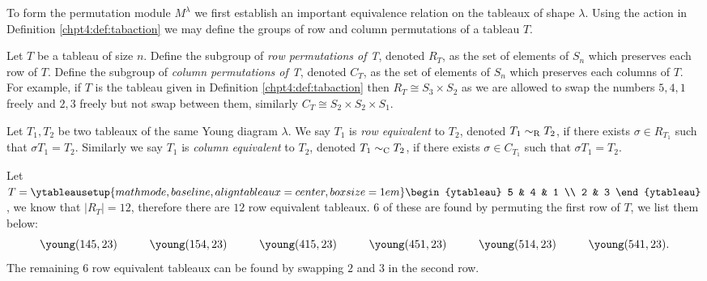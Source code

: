 \documentclass[11pt]{report}
\begin{document}
To form the permutation module $M^{\lambda}$ we first establish an important equivalence relation on the tableaux of shape $\lambda$. Using the action in Definition 
\ref{chpt4:def:tabaction} we may define the groups of row and column 	
permutations of a tableau $T$.
\begin{defn}
	\label{chpt4:def:rowequiv}
	Let $T$ be a tableau of size $n$. Define the subgroup of \emph{row permutations of T}, denoted $R_{T}$, as the set of elements of $S_{n}$ which preserves each row of $T$.  Define the subgroup of \emph{column permutations of T}, denoted $C_{T}$, as the set of elements of $S_{n}$ which preserves each columns of $T$. For example, if 
	$T$ is the tableau given in Definition \ref{chpt4:def:tabaction} then 
	$R_{T} \cong S_{3} \times S_{2}$ as we are 
	allowed to swap the numbers $5,4,1$ freely and $2,3$ freely but not 
	swap between them, similarly $C_{T} \cong S_{2} \times S_{2} \times S_{1}$.
\end{defn}

\begin{defn}
	Let $T_{1}, T_{2}$ be two tableaux of the same Young diagram $\lambda$. 
	We say $T_{1}$ is \emph{row equivalent} to 
	$T_{2}$, denoted $T_{1} \sim_{\textnormal{R}} T_{2}$, if there exists 
	$\sigma \in R_{T_{1}}$ such that $\sigma T_{1} = T_{2}$. Similarly we 
	say $T_{1}$ is \emph{column equivalent} to $T_{2}$, denoted $T_{1} 
	\sim_{\textnormal{C}} T_{2}$, if there exists $\sigma \in C_{T_{1}}$ 
	such that $\sigma T_{1} = T_{2}$.
\end{defn}

\begin{example}
	Let $T = \ytableausetup{mathmode,baseline,aligntableaux=center,boxsize=1em}
	\begin{ytableau} 5 & 4 & 1 \\	2 & 3 \end{ytableau}$, we know that $|R_{T}| = 12$, therefore there are $12$ row equivalent tableaux. $6$ of these are found by permuting the first row of $T$, we list them below:
	\[
	\young(145,23) \hspace{1cm} \young(154,23)
	\hspace{1cm}  
	\young(415,23) \hspace{1cm} \young(451,23) \hspace{1cm}  
	\young(514,23) \hspace{1cm}  
	\young(541,23) .\]
	The remaining $6$ row equivalent tableaux can be found by swapping $2$ and $3$ in the second row.  		
\end{example}
\end{document}
